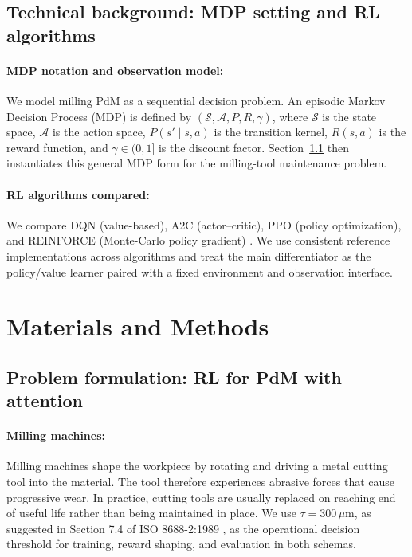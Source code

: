 \documentclass[sn-basic]{sn-jnl} %
\begin{document}
\subsection{Technical background: MDP setting and RL algorithms}
\label{sec:tech_background}
\paragraph{MDP notation and observation model:}
We model milling PdM as a sequential decision problem. An episodic Markov Decision Process (MDP) is defined by $(\mathcal{S},\mathcal{A},P,R,\gamma)$, where $\mathcal{S}$ is the state space, $\mathcal{A}$ is the action space, $P(s'\mid s,a)$ is the transition kernel, $R(s,a)$ is the reward function, and $\gamma\in(0,1]$ is the discount factor. Section~\ref{sec:env} then instantiates this general MDP form for the milling-tool maintenance problem.

\paragraph{RL algorithms compared:}
We compare DQN (value-based), A2C (actor--critic), PPO (policy optimization), and \textsc{REINFORCE} (Monte-Carlo policy gradient) \cite{Mnih2015, Schulman2017, Williams1992}. We use consistent reference implementations across algorithms and treat the main differentiator as the policy/value learner paired with a fixed environment and observation interface.

\section{Materials and Methods}
\label{sec:method}

\subsection{Problem formulation: RL for PdM with attention}
\label{sec:env} \label{app:env_reward}
\paragraph{Milling machines:}
Milling machines shape the workpiece by rotating and driving a metal cutting tool into the material. The tool therefore experiences abrasive forces that cause progressive wear. In practice, cutting tools are usually replaced on reaching end of useful life rather than being maintained in place. We use $\tau = 300\,\mu\mathrm{m}$, as suggested in Section 7.4 of ISO 8688-2:1989 \citep{ISO8688-2-1989}, as the operational decision threshold for training, reward shaping, and evaluation in both schemas. 
\end{document}
